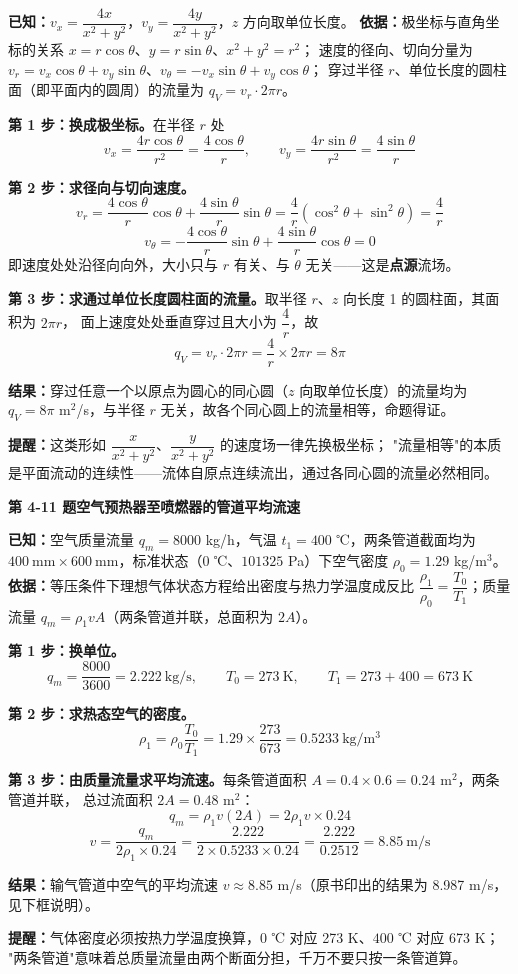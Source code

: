 \begin{jie}
\textbf{已知：}$v_x=\dfrac{4x}{x^2+y^2}$，$v_y=\dfrac{4y}{x^2+y^2}$，$z$ 方向取单位长度。
\textbf{依据：}极坐标与直角坐标的关系 $x=r\cos\theta$、$y=r\sin\theta$、$x^2+y^2=r^2$；
速度的径向、切向分量为 $v_r=v_x\cos\theta+v_y\sin\theta$、$v_\theta=-v_x\sin\theta+v_y\cos\theta$；
穿过半径 $r$、单位长度的圆柱面（即平面内的圆周）的流量为 $q_V=v_r\cdot2\pi r$。

\textbf{第 1 步：换成极坐标。}在半径 $r$ 处
\[ v_x=\frac{4r\cos\theta}{r^2}=\frac{4\cos\theta}{r},\qquad v_y=\frac{4r\sin\theta}{r^2}=\frac{4\sin\theta}{r} \]

\textbf{第 2 步：求径向与切向速度。}
\[ v_r=\frac{4\cos\theta}{r}\cos\theta+\frac{4\sin\theta}{r}\sin\theta
      =\frac{4}{r}\left(\cos^2\theta+\sin^2\theta\right)=\frac{4}{r} \]
\[ v_\theta=-\frac{4\cos\theta}{r}\sin\theta+\frac{4\sin\theta}{r}\cos\theta=0 \]
即速度处处沿径向向外，大小只与 $r$ 有关、与 $\theta$ 无关——这是\textbf{点源}流场。

\textbf{第 3 步：求通过单位长度圆柱面的流量。}取半径 $r$、$z$ 向长度 1 的圆柱面，其面积为 $2\pi r$，
面上速度处处垂直穿过且大小为 $\dfrac{4}{r}$，故
\[ q_V=v_r\cdot2\pi r=\frac{4}{r}\times2\pi r=8\pi \]

\textbf{结果：}穿过任意一个以原点为圆心的同心圆（$z$ 向取单位长度）的流量均为
$q_V=8\pi$ m$^2$/s，与半径 $r$ 无关，故各个同心圆上的流量相等，命题得证。

\textbf{提醒：}这类形如 $\dfrac{x}{x^2+y^2}$、$\dfrac{y}{x^2+y^2}$ 的速度场一律先换极坐标；
"流量相等"的本质是平面流动的连续性——流体自原点连续流出，通过各同心圆的流量必然相同。
\end{jie}

\noindent\textbf{第 4-11 题\quad 空气预热器至喷燃器的管道平均流速}

\begin{jie}
\textbf{已知：}空气质量流量 $q_m=8000$ kg/h，气温 $t_1=400$ ℃，两条管道截面均为
$400\ \mathrm{mm}\times600\ \mathrm{mm}$，标准状态（$0$ ℃、$101325$ Pa）下空气密度 $\rho_0=1.29$ kg/m$^3$。
\textbf{依据：}等压条件下理想气体状态方程给出密度与热力学温度成反比
$\dfrac{\rho_1}{\rho_0}=\dfrac{T_0}{T_1}$；质量流量 $q_m=\rho_1vA$（两条管道并联，总面积为 $2A$）。

\textbf{第 1 步：换单位。}
\[ q_m=\frac{8000}{3600}=2.222\ \mathrm{kg/s},\qquad
   T_0=273\ \mathrm{K},\qquad T_1=273+400=673\ \mathrm{K} \]

\textbf{第 2 步：求热态空气的密度。}
\[ \rho_1=\rho_0\frac{T_0}{T_1}=1.29\times\frac{273}{673}=0.5233\ \mathrm{kg/m^3} \]

\textbf{第 3 步：由质量流量求平均流速。}每条管道面积 $A=0.4\times0.6=0.24$ m$^2$，两条管道并联，
总过流面积 $2A=0.48$ m$^2$：
\[ q_m=\rho_1v(2A)=2\rho_1v\times0.24 \]
\[ v=\frac{q_m}{2\rho_1\times0.24}=\frac{2.222}{2\times0.5233\times0.24}=\frac{2.222}{0.2512}=8.85\ \mathrm{m/s} \]

\textbf{结果：}输气管道中空气的平均流速 $v\approx8.85$ m/s（原书印出的结果为 8.987 m/s，见下框说明）。

\textbf{提醒：}气体密度必须按热力学温度换算，$0$ ℃ 对应 273 K、$400$ ℃ 对应 673 K；
"两条管道"意味着总质量流量由两个断面分担，千万不要只按一条管道算。
\end{jie}

